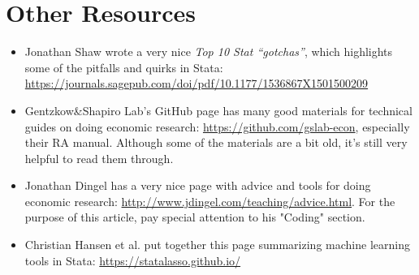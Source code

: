 \section{Other Resources}
\begin{itemize}
    \item Jonathan Shaw wrote a very nice \textit{Top 10 Stat ``gotchas''}, which highlights some of the pitfalls and quirks in Stata: \url{https://journals.sagepub.com/doi/pdf/10.1177/1536867X1501500209}
    \item Gentzkow\&Shapiro Lab's GitHub page has many good materials for technical guides on doing economic research: \url{https://github.com/gslab-econ}, especially their RA manual. Although some of the materials are a bit old, it's still very helpful to read them through. 
    \item Jonathan Dingel has a very nice page with advice and tools for doing economic research: \url{http://www.jdingel.com/teaching/advice.html}. For the purpose of this article, pay special attention to his "Coding" section. 
    \item Christian Hansen et al. put together this page summarizing machine learning tools in Stata: \url{https://statalasso.github.io/}
\end{itemize}